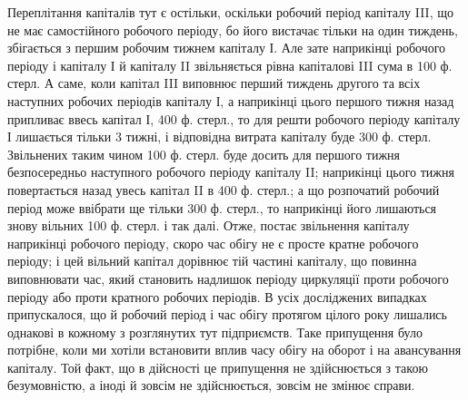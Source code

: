 Переплітання капіталів тут є остільки, оскільки робочий період капіталу
III, що не має самостійного робочого періоду, бо його вистачає
тільки на один тиждень, збігається з першим робочим тижнем капіталу І.
Але зате наприкінці робочого періоду і капіталу І й капіталу II
звільняється рівна капіталові III сума в 100 ф. стерл. А саме, коли капітал
III виповнює перший тиждень другого та всіх наступних робочих періодів
капіталу І, а наприкінці цього першого тижня назад припливає ввесь
капітал І, 400 ф. стерл., то для решти робочого періоду капіталу І лишається
тільки 3 тижні, і відповідна витрата капіталу буде 300 ф. стерл. Звільнених
таким чином 100 ф. стерл. буде досить для першого тижня безпосередньо
наступного робочого періоду капіталу II; наприкінці цього тижня повертається
назад увесь капітал II в 400 ф. стерл.; а що розпочатий робочий
період може ввібрати ще тільки 300 ф. стерл., то наприкінці його лишаються
знову вільних 100 ф. стерл. і так далі. Отже, постає звільнення капіталу
наприкінці робочого періоду, скоро час обігу не є просте кратне
робочого періоду; і цей вільний капітал дорівнює тій частині капіталу,
що повинна виповнювати час, який становить надлишок періоду циркуляції
проти робочого періоду або проти кратного робочих періодів.
В усіх досліджених випадках припускалося, що й робочий період і
час обігу протягом цілого року лишались однакові в кожному з розглянутих
тут підприємств. Таке припущення було потрібне, коли ми хотіли
встановити вплив часу обігу на оборот і на авансування капіталу. Той
факт, що в дійсності це припущення не здійснюється з такою безумовністю,
а іноді й зовсім не здійснюється, зовсім не змінює справи.

